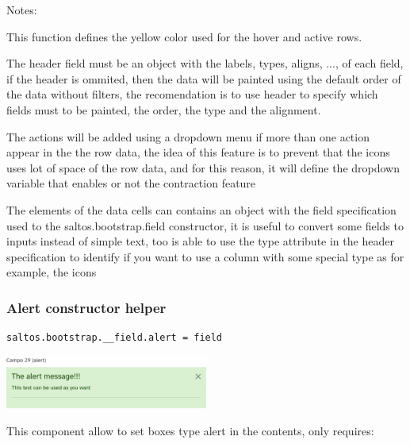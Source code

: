 \documentclass[a4paper]{article}
\begin{document}
Notes:

This function defines the yellow color used for the hover and active rows.

The header field must be an object with the labels, types, aligns, ..., of each field,
if the header is ommited, then the data will be painted using the default order of the
data without filters, the recomendation is to use header to specify which fields must
to be painted, the order, the type and the alignment.

The actions will be added using a dropdown menu if more than one action appear in the
the row data, the idea of this feature is to prevent that the icons uses lot of space
of the row data, and for this reason, it will define the dropdown variable that enables
or not the contraction feature

The elements of the data cells can contains an object with the field specification used
to the saltos.bootstrap.field constructor, it is useful to convert some fields to inputs
instead of simple text, too is able to use the type attribute in the header specification
to identify if you want to use a column with some special type as for example, the icons

\hypertarget{toc76}{}
\subsubsection{Alert constructor helper}

\begin{lstlisting}
saltos.bootstrap.__field.alert = field
\end{lstlisting}

\begin{center}\includegraphics[width=0.5\textwidth]{../ujest/snaps/test-bootstrap-js-bootstrap-campo-29-alert-1-snap.png}\end{center}

This component allow to set boxes type alert in the contents, only requires:
\end{document}
